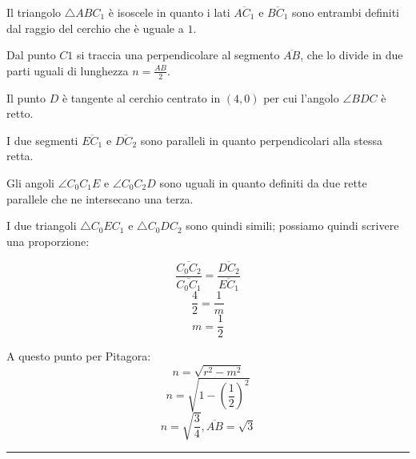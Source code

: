 Il triangolo $\triangle{ABC_1}$ è isoscele in quanto i lati $\overline{AC_1}$ e
$\overline{BC_1}$ sono entrambi definiti 
dal raggio del cerchio che è uguale a $1$.

Dal punto $C1$ si traccia una perpendicolare al segmento $\overline{AB}$, che lo divide 
in due parti uguali di lunghezza $n=\frac{AB}{2}$.

Il punto $D$ è tangente al cerchio centrato in $(4,0)$ per cui l'angolo $\angle{BDC}$ è retto.

I due segmenti $\overline{EC_1}$ e $\overline{DC_2}$ sono paralleli in quanto perpendicolari alla stessa retta.

Gli angoli $\angle{C_0C_1E}$ e $\angle{C_0C_2D}$ sono uguali in quanto definiti da due rette parallele
che ne intersecano una terza.

I due triangoli $\triangle{C_0EC_1}$ e $\triangle{C_0DC_2}$ sono quindi simili; possiamo quindi scrivere 
una proporzione:

\[ \frac{\overline{C_0C_2}}{\overline{C_0C_1}} = \frac{\overline{DC_2}}{\overline{EC_1}} \]
\[ \frac{4}{2} = \frac{1}{m} \]
\[ m=\frac{1}{2} \]

A questo punto per Pitagora:
\[ n=\sqrt{r^2-m^2} \]
\[ n=\sqrt{1-\left(\frac{1}{2}\right)^2} \]
\[ n=\sqrt{\frac{3}{4}}, \overline{AB}=\sqrt{3} \]





\vspace{1cm}
\hrule
\vspace{1cm}



